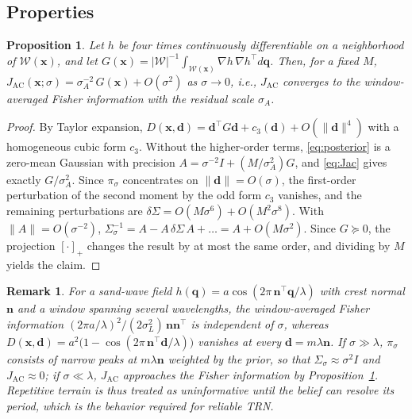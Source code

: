 \documentclass[letterpaper, 10 pt, journal, twoside]{IEEEtran}
\newtheorem{proposition}{Proposition}
\newtheorem{remark}{Remark}
\newcommand{\bx}{\mathbf{x}}
\newcommand{\bd}{\mathbf{d}}
\newcommand{\bq}{\mathbf{q}}
\newcommand{\JA}{J_{\mathrm{AC}}}
\begin{document}
\subsection{Properties}
\begin{proposition}\label{prop:fisher}
Let $h$ be four times continuously differentiable on a neighborhood of $\mathcal{W}(\bx)$, and let $G(\bx) = |\mathcal{W}|^{-1}\int_{\mathcal{W}(\bx)} \nabla h\,\nabla h^\top d\bq$. Then, for a fixed $M$, $\JA(\bx;\sigma) = \sigma_A^{-2}\,G(\bx) + O(\sigma^2)$ as $\sigma \to 0$, i.e., $\JA$ converges to the window-averaged Fisher information with the residual scale $\sigma_A$.
\end{proposition}

\begin{proof}
By Taylor expansion, $D(\bx,\bd) = \bd^\top G\bd + c_3(\bd) + O(\|\bd\|^4)$ with a homogeneous cubic form $c_3$. Without the higher-order terms, \eqref{eq:posterior} is a zero-mean Gaussian with precision $A = \sigma^{-2}I + (M/\sigma_A^2)G$, and \eqref{eq:Jac} gives exactly $G/\sigma_A^2$. Since $\pi_\sigma$ concentrates on $\|\bd\| = O(\sigma)$, the first-order perturbation of the second moment by the odd form $c_3$ vanishes, and the remaining perturbations are $\delta\Sigma = O(M\sigma^6) + O(M^2\sigma^8)$. With $\|A\| = O(\sigma^{-2})$, $\Sigma_\sigma^{-1} = A - A\,\delta\Sigma\,A + \ldots = A + O(M\sigma^2)$. Since $G \succeq 0$, the projection $[\cdot]_+$ changes the result by at most the same order, and dividing by $M$ yields the claim.
\end{proof}

\begin{remark}\label{rem:periodic}
For a sand-wave field $h(\bq) = a\cos(2\pi\,\mathbf{n}^\top\bq/\lambda)$ with crest normal $\mathbf{n}$ and a window spanning several wavelengths, the window-averaged Fisher information $(2\pi a/\lambda)^2/(2\sigma_L^2)\,\mathbf{n}\mathbf{n}^\top$ is independent of $\sigma$, whereas $D(\bx,\bd) = a^2\big(1 - \cos(2\pi\,\mathbf{n}^\top\bd/\lambda)\big)$ vanishes at every $\bd = m\lambda\mathbf{n}$. If $\sigma \gg \lambda$, $\pi_\sigma$ consists of narrow peaks at $m\lambda\mathbf{n}$ weighted by the prior, so that $\Sigma_\sigma \approx \sigma^2 I$ and $\JA \approx 0$; if $\sigma \ll \lambda$, $\JA$ approaches the Fisher information by Proposition~\ref{prop:fisher}. Repetitive terrain is thus treated as uninformative until the belief can resolve its period, which is the behavior required for reliable TRN.
\end{remark}
\end{document}
